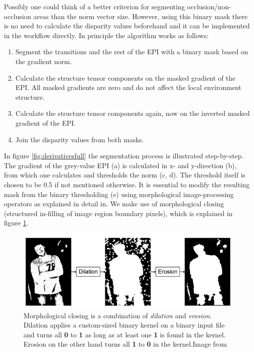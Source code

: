 \documentclass  [
  paper    = a4,
  BCOR     = 10mm,
  twoside,
  fontsize = 12pt,
  fleqn,
  toc      = bibnumbered,
  toc      = listofnumbered,
  numbers  = noendperiod,
  headings = normal,
  listof   = leveldown,
  version  = 3.03
]                                       {scrreprt}
\begin{document}
 Possibly one could think of a better criterion for segmenting occlusion/non-occlusion areas than the norm vector size. However, using this binary mask there is no need to calculate the disparity values beforehand and it can be implemented in the workflow directly. In principle the algorithm works as follows:
 \begin{enumerate}
 	\item Segment the transitions and the rest of the EPI with a binary mask based on the gradient norm.
 	\item Calculate the structure tensor components on the masked gradient of the EPI. All masked gradients are zero and do not affect the local environment structure.
 	\item Calculate the structure tensor components again, now on the inverted masked gradient of the EPI.
 	\item Join the disparity values from both masks.
 \end{enumerate}
 In figure \ref{fig:derivativesfull} the segmentation process is illustrated step-by-step. The gradient of the grey-value EPI (a) is calculated in x- and y-direction (b), from which one calculates and thresholds the norm (c, d). The threshold itself is chosen to be 0.5 if not mentioned otherwise. It is essential to modify the resulting mask from the binary thresholding (e) using morphological image-processing operators as explained in detail in\cite{homepages.inf.ed.ac.uk}. We make use of morphological closing (structured in-filling of image region boundary pixels), which is explained in figure \ref{fig:closing}.
 \begin{figure}[h!]
 	\centering
 	\includegraphics[width=0.7\linewidth]{images/closing}
 	\caption[Morphological closing]{Morphological closing is a combination of \textit{dilation} and \textit{erosion}. Dilation applies a custom-sized binary kernel on a binary input file and turns all \textbf{0} to \textbf{1} as long as at least one \textbf{1} is found in the kernel. Erosion on the other hand turns all \textbf{1} to \textbf{0} in the kernel.Image from \cite{what-when-how.com}}
 	\label{fig:closing}
 \end{figure}
\end{document}
